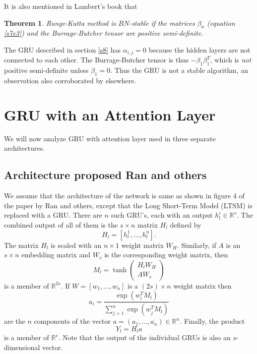 \documentclass{article}
\numberwithin{equation}{section}
\newtheorem{thm}{Theorem}
\begin{document}
It is also mentioned in Lambert's book \cite{lambert1991numerical} that
\begin{thm}\label{s9t1}
Runge-Kutta method is $BN$-stable if the matrices $\beta_n$ (equation
\eqref{s7e3}) and the Burrage-Butcher tensor are positive semi-definite.
\end{thm}

The GRU described in section \ref{s8} has $\alpha_{i, j} = 0$ because the
hidden layers are not connected to each other. The Burrage-Butcher tensor 
is thus $-\beta_1 \beta_1^T$, which is \emph{not} positive semi-definite 
unless $\beta_1 = 0$.  Thus the GRU is not a stable algorithm, an 
observation also corroborated by elsewhere\cite{kanai2017preventing}.

\section{GRU with an Attention Layer}\label{s10}
We will now analyze GRU with attention layer used in three separate
architectures. 
\subsection{Architecture proposed Ran and others} 
We assume that the architecture of the network is same as shown in figure 4 
of the paper \cite{ran2019lstm} by Ran and others, except that the 
Long Short-Term Model (LTSM) is replaced with a GRU. There are $n$ such 
GRU's, each with an output $h^i_l \in \mathbb{R}^s$. The combined output 
of all of them is the $s \times n$ matrix $H_l$ defined by
\begin{equation}\label{s10e1}
H_l = [h^1_l, \ldots, h^n_l].
\end{equation}
The matrix $H_l$ is scaled with an $n \times 1$  weight matrix $W_H$. 
Similarly, if $A$ is an $s \times n$ embedding matrix and $W_v$ is the
corresponding weight matrix, then
\begin{equation}\label{s10e2}
M_l = \tanh\begin{pmatrix} H_lW_H \\ AW_v \end{pmatrix}
\end{equation}
is a member of $\mathbb{R}^{2s}$. If $W= [w_1, \ldots, w_n]$ is a $(2s) 
\times n$ weight matrix then
\begin{equation}\label{s10e3}
a_i = \frac{\exp(w_i^T M_l)}{\sum_{j=1}^n \exp(w_j^T M_l)}
\end{equation}
are the $n$ components of the vector $a = (a_1, \ldots, a_n)
\in \mathbb{R}^n$. Finally, the product
\begin{equation}\label{s10e4}
Y_l = H_l a
\end{equation}
is a member of $\mathbb{R}^s$. Note that the output of the individual
GRUs is also an $s$-dimensional vector.
\end{document}
